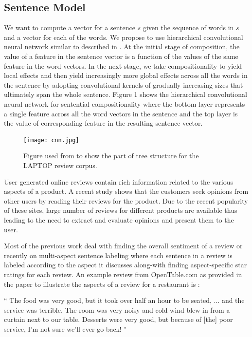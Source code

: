 \documentclass{article}
\begin{document}
\subsection{Sentence Model}
We want to compute a vector for a sentence $s$ given the sequence of words in $s$ and a vector for each of the words. We propose to use hierarchical convolutional neural network similar to described in \cite{ Kalchbrenner}. At the initial stage of composition, the value of a feature in the sentence vector is a function of the values of the same feature in the word vectors. In the next stage, we take compositionality to yield local effects and then yield increasingly more global effects across all the words in the sentence by adopting convolutional kernels of gradually increasing sizes that ultimately span the whole sentence. Figure 1 shows the hierarchical convolutional neural network for sentential compositionality where the bottom layer represents a single feature across all the word vectors in the sentence and the top layer is the value of corresponding feature in the resulting sentence vector. 

\begin{figure}[ht]
\vskip 0.2in
\begin{center}
\centerline{\texttt{[image: cnn.jpg]}}
\caption{Figure used from \cite{Kim} to show the part of tree structure for the LAPTOP review corpus.}
\label{icml-historical}
\end{center}
\vskip -0.2in
\end{figure} 



User generated online reviews contain rich information related to the various aspects of a product. A recent study \cite{Chen} shows that the customers seek opinions from other users by reading their reviews for the product. Due to the recent popularity of these sites, large number of reviews for different products are available thus leading to the need to extract and evaluate opinions and present them to the user. 

Most of the previous work deal with finding the overall sentiment of a review or recently on multi-aspect sentence labeling where each sentence in a review is labeled according to the aspect it discusses along-with finding aspect-specific star ratings for each review. An example review from OpenTable.com as provided in the paper \cite{Lu} to illustrate the aspects of a review for a restaurant is :

`` The food was very good, but it took over half an hour to be seated, ... and the service was terrible. The room was very noisy and cold wind blew in from a curtain next to our table. Desserts were very good, but because of [the] poor service, I'm not sure we'll ever go back$!$ " 
\end{document}
